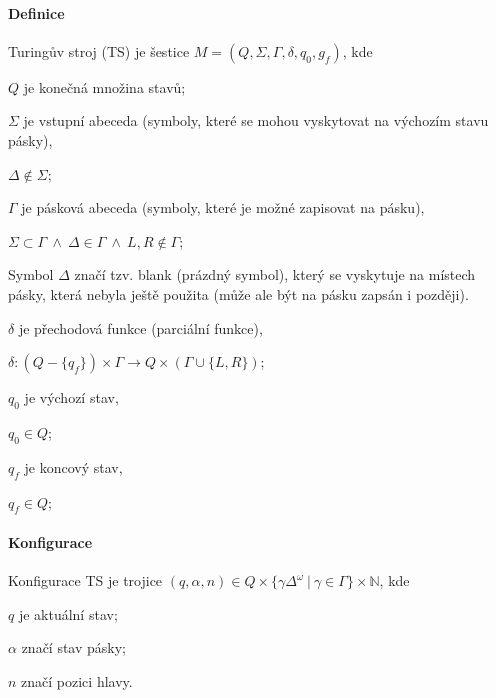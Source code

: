 \paragraph*{Definice} Turingův stroj (TS) je šestice $M = (Q, \Sigma, \Gamma, \delta, q_0, g_f)$, kde \begin{compactitem}
    \item $Q$ je konečná množina stavů;

    \item $\Sigma$ je vstupní abeceda (symboly, které se mohou vyskytovat na výchozím stavu pásky), \begin{compactitem}
        \item $\Delta \not\in \Sigma$;
    \end{compactitem}

    \item $\Gamma$ je pásková abeceda (symboly, které je možné zapisovat na pásku), \begin{compactitem}
        \item $\Sigma \subset \Gamma ~\land~ \Delta \in \Gamma ~\land~ L, R \not\in \Gamma$;
        \item Symbol $\Delta$ značí tzv. blank (prázdný symbol), který se vyskytuje na místech pásky,
        která nebyla ještě použita (může ale být na pásku zapsán i později).
    \end{compactitem}

    \item $\delta$ je přechodová funkce (parciální funkce), \begin{compactitem}
        \item $\delta : (Q - \{ q_f \}) \times \Gamma \rightarrow Q \times (\Gamma \cup \{ L, R \})$;
    \end{compactitem}

    \item $q_0$ je výchozí stav, \begin{compactitem}
        \item $q_0 \in Q$;
    \end{compactitem}

    \item $q_f$ je koncový stav, \begin{compactitem}
        \item $q_f \in Q$;
    \end{compactitem}
\end{compactitem}

\paragraph*{Konfigurace} Konfigurace TS je trojice $(q, \alpha, n) \in Q \times \{ \gamma \Delta^{\omega} ~|~ \gamma \in \Gamma \} \times \mathbb{N}$, kde \begin{compactitem}
    \item $q$ je aktuální stav;
    \item $\alpha$ značí stav pásky;
    \item $n$ značí pozici hlavy.
\end{compactitem}


